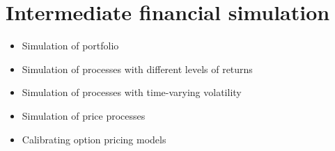 \chapter{Intermediate financial simulation}
\begin{itemize}
    \setlength\itemsep{0em}
    \item Simulation of portfolio
    \item Simulation of processes with different levels of returns
    \item Simulation of processes with time-varying volatility
    \item Simulation of price processes
    \item Calibrating option pricing models
\end{itemize}